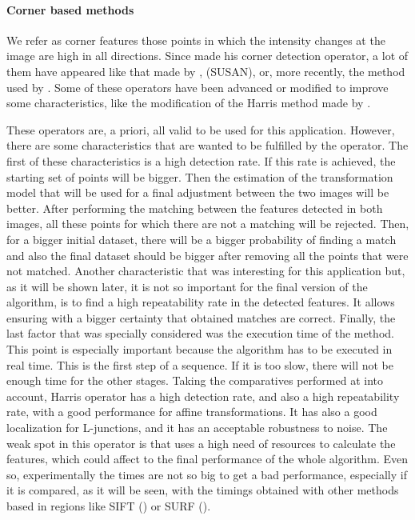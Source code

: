 \paragraph{Corner based methods}\label{ch:chapter02_01_02_01_01}

We refer as corner features those points in which the intensity changes at the image are high in all directions. Since \cite{hans1977towards} made his corner detection operator, a lot of them have appeared like that made by \cite{harris1988combined}, \cite{smith1997susan} (SUSAN), or, more recently, the method used by \cite{rosten2006machine}. Some of these operators have been advanced or modified to improve some characteristics, like the modification of the Harris method made by \cite{shi1994good}.

These operators are, a priori, all valid to be used for this application. However, there are some characteristics that are wanted to be fulfilled by the operator. The first of these characteristics is a high detection rate. If this rate is achieved, the starting set of points will be bigger. Then the estimation of the transformation model that will be used for a final adjustment between the two images will be better. After performing the matching between the features detected in both images, all these points for which there are not a matching will be rejected. Then, for a bigger initial dataset, there will be a bigger probability of finding a match and also the final dataset should be bigger after removing all the points that were not matched. Another characteristic that was interesting for this application but, as it will be shown later, it is not so important for the final version of the algorithm, is to find a high repeatability rate in the detected features. It allows ensuring with a bigger certainty that obtained matches are correct. Finally, the last factor that was specially considered was the execution time of the method. This point is especially important because the algorithm has to be executed in real time. This is the first step of a sequence. If it is too slow, there will not be enough time for the other stages. Taking the comparatives performed at \cite{mohanna2001performance, zheng1999analysis} into account, Harris operator has a high detection rate, and also a high repeatability rate, with a good performance for affine transformations. It has also a good localization for L-junctions, and it has an acceptable robustness to noise. The weak spot in this operator is that uses a high need of resources to calculate the features, which could affect to the final performance of the whole algorithm. Even so, experimentally the times are not so big to get a bad performance, especially if it is compared, as it will be seen, with the timings obtained with other methods based in regions like SIFT (\cite{lowe1999object}) or SURF (\cite{Bay2008speeded}).


